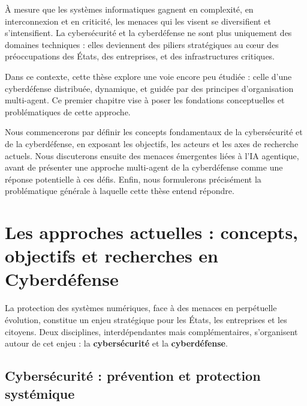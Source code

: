 \documentclass[ twoside,openright,titlepage,numbers=noenddot,headinclude,%
                footinclude=true,cleardoublepage=empty,abstractoff, %
                BCOR=5mm,paper=a4,fontsize=11pt,%
                french,american,%
                ]{scrreprt}
\begin{document}
\noindent
À mesure que les systèmes informatiques gagnent en complexité, en interconnexion et en criticité, les menaces qui les visent se diversifient et s'intensifient. La cybersécurité et la cyberdéfense ne sont plus uniquement des domaines techniques : elles deviennent des piliers stratégiques au cœur des préoccupations des États, des entreprises, et des infrastructures critiques.

Dans ce contexte, cette thèse explore une voie encore peu étudiée : celle d'une cyberdéfense distribuée, dynamique, et guidée par des principes d'organisation multi-agent. Ce premier chapitre vise à poser les fondations conceptuelles et problématiques de cette approche.

Nous commencerons par définir les concepts fondamentaux de la cybersécurité et de la cyberdéfense, en exposant les objectifs, les acteurs et les axes de recherche actuels. Nous discuterons ensuite des menaces émergentes liées à l'IA agentique, avant de présenter une approche multi-agent de la cyberdéfense comme une réponse potentielle à ces défis. Enfin, nous formulerons précisément la problématique générale à laquelle cette thèse entend répondre.

\section{Les approches actuelles : concepts, objectifs et recherches en Cyberdéfense}\label{sec:cyberdef-panorama}


La protection des systèmes numériques, face à des menaces en perpétuelle évolution, constitue un enjeu stratégique pour les États, les entreprises et les citoyens. Deux disciplines, interdépendantes mais complémentaires, s'organisent autour de cet enjeu : la \textbf{cybersécurité} et la \textbf{cyberdéfense}.

\subsection*{Cybersécurité : prévention et protection systémique}
\end{document}
